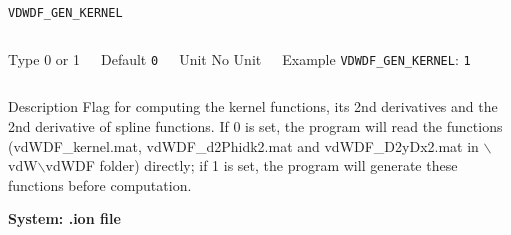\documentclass[xcolor=dvipsnames,t]{beamer}
\begin{document}
\begin{frame}[allowframebreaks]{\texttt{VDWDF\_GEN\_KERNEL}} \label{VDWDF_GEN_KERNEL}
\vspace*{-12pt}
\begin{columns}
\begin{block}{Type}
0 or 1
\end{block}

\begin{block}{Default}
\texttt{0}
\end{block}

\begin{block}{Unit}
No Unit
\end{block}

\begin{block}{Example}
\texttt{VDWDF\_GEN\_KERNEL}: \texttt{1}
\end{block}
\end{columns}

\begin{block}{Description}
Flag for computing the kernel functions, its 2nd derivatives and the 2nd derivative of spline functions. If 0 is set, the program will read the functions (vdWDF\_kernel.mat, vdWDF\_d2Phidk2.mat and vdWDF\_D2yDx2.mat in $\backslash$vdW$\backslash$vdWDF folder) directly; if 1 is set, the program will generate these functions before computation.
\end{block}
\end{frame}


\begin{frame}[allowframebreaks,c]{} \label{System:ion}

\begin{center}
\Huge \textbf{System: .ion file}
\end{center}

\end{frame}
\end{document}
